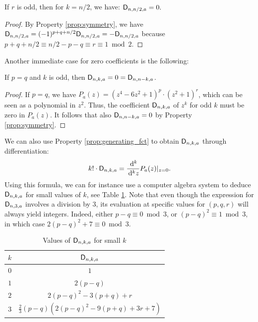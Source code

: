 \documentclass[11pt]{llncs}
\begin{document}
\begin{Corollary}
	If $r$ is odd, then for $k=n/2$, we have: $\mathsf{D}_{n,n/2,a}=0.$
\end{Corollary}

\begin{proof}
	By Property \ref{prop:symmetry}, we have $\mathsf{D}_{n,n/2,a}=(-1)^{p+q+n/2}\mathsf{D}_{n,n/2,a}=-\mathsf{D}_{n,n/2,a}$ because $p+q+n/2\equiv n/2-p-q\equiv r\equiv 1\bmod 2$.
\end{proof}

Another immediate case for zero coefficients is the following:
\begin{Prop}

    If $p=q$ and $k$ is odd, then $\mathsf{D}_{n,k,a}=0=\mathsf{D}_{n,n-k,a}$.
\end{Prop}

\begin{proof}
    If $p=q$, we have $P_a(z)=(z^4-6z^2+1)^p\cdot(z^2+1)^r$, which can be seen as a polynomial in $z^2$. Thus, the coefficient $\mathsf{D}_{n,k,a}$ of $z^k$ for odd $k$ must be zero in $P_a(z)$. It follows that also $\mathsf{D}_{n,n-k,a}=0$ by Property \ref{prop:symmetry}.
\end{proof}

\begin{remark}
    We can also use Property \ref{prop:generating_fct} to obtain $\mathsf{D}_{n,k,a}$ through differentiation:
    \[
        k!\cdot\mathsf{D}_{n,k,a}=\frac{\,\mathrm d^k}{\,\mathrm d^k z}P_a(z)\vert_{z=0}.
    \]
    Using this formula, we can for instance use a computer algebra system to deduce $\mathsf{D}_{n,k,a}$ for small values of $k$, see Table \ref{tab:Dnka_small_k}. Note that even though the expression for $\mathsf{D}_{n,3,a}$ involves a division by $3$, its evaluation at specific values for $(p,q,r)$ will always yield integers. Indeed, either $p-q\equiv 0\bmod 3$, or $(p-q)^2\equiv 1\bmod 3$, in which case $2(p-q)^2+7\equiv 0\bmod 3$.
    
    \begin{table}
    	\centering
    	\begin{tabular}{|c|c|}
    		\hline
    		$k$ & $\mathsf{D}_{n,k,a}$\\ \hline
    		$0$&$1$\\ \hline
            $1$&$2(p-q)$\\ \hline
            $2$&$2(p-q)^2-3(p+q)+r$\\ \hline
            $3$&$\frac 23(p-q)\left(2(p-q)^2-9(p+q)+3r+7\right)$\\ \hline
    	\end{tabular}
    	\caption{Values of $\mathsf{D}_{n,k,a}$ for small $k$}\label{tab:Dnka_small_k}
    \end{table}
\end{remark}
\end{document}
